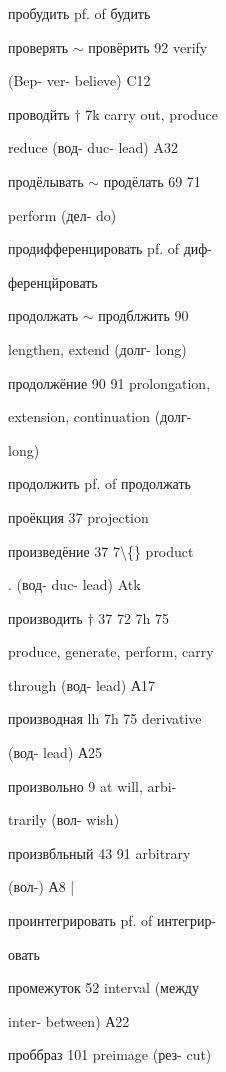 \begin{minipage}[t]{0.475\textwidth}
\raggedright
\noindent пробудить pf. of будить\par
\noindent проверять $\sim$ провёрить 92 verify\par
\noindent (Bep- ver- believe) C12\par
\noindent проводйть $\dagger$ 7k carry out, produce\par
\noindent reduce (вод- duc- lead) A32\par
\noindent продёлывать $\sim$ продёлать 69 71\par
\noindent perform (дел- do)\par
\noindent продифференцировать pf. of диф-\par
\noindent ференцйровать\par
\noindent продолжать $\sim$ продблжить 90\par
\noindent lengthen, extend (долг- long)\par
\noindent продолжёние 90 91 prolongation,\par
\noindent extension, continuation (долг-\par
\noindent long)\par
\noindent продолжить pf. of продолжать\par
\noindent проёкция 37 projection\par
\noindent произведёние 37 7\textbackslash\{\} product\par
\noindent . (вод- duc- lead) Atk\par
\noindent производить $\dagger$ 37 72 7h 75\par
\noindent produce, generate, perform, carry\par
\noindent through (вод- lead) А17\par
\noindent производная lh 7h 75 derivative\par
\noindent (вод- lead) А25\par
\noindent произвольно 9 at will, arbi-\par
\noindent trarily (вол- wish)\par
\noindent произвбльный 43 91 arbitrary\par
\noindent (вол-) А8 |\par
\noindent проинтегрировать pf. of интегрир-\par
\noindent овать\par
\noindent промежуток 52 interval (между\par
\noindent inter- between) А22\par
\noindent проббраз 101 preimage (рез- cut)\par

\end{minipage}

